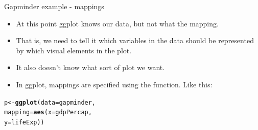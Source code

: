 \documentclass[10pt,handout]{beamer}\usepackage[]{graphicx}\usepackage[]{color}
\makeatletter
\newcommand{\hlstd}[1]{\textcolor[rgb]{0.345,0.345,0.345}{#1}}%
\newcommand{\hlkwb}[1]{\textcolor[rgb]{0.69,0.353,0.396}{#1}}%
\newcommand{\hlkwc}[1]{\textcolor[rgb]{0.333,0.667,0.333}{#1}}%
\newcommand{\hlkwd}[1]{\textcolor[rgb]{0.737,0.353,0.396}{\textbf{#1}}}%
\newenvironment{kframe}{%
 \def\at@end@of@kframe{}%
 \ifinner\ifhmode%
  \def\at@end@of@kframe{\end{minipage}}%
  \begin{minipage}{\columnwidth}%
 \fi\fi%
 \def\FrameCommand##1{\hskip\@totalleftmargin \hskip-\fboxsep
 \colorbox{shadecolor}{##1}\hskip-\fboxsep
     \hskip-\linewidth \hskip-\@totalleftmargin \hskip\columnwidth}%
 \MakeFramed {\advance\hsize-\width
   \@totalleftmargin\z@ \linewidth\hsize
   \@setminipage}}%
 {\par\unskip\endMakeFramed%
 \at@end@of@kframe}
\newenvironment{knitrout}{}{} %
\makeatother
\begin{document}
\begin{frame}[fragile]{Gapminder example - mappings}
	
	\begin{itemize}
		\item At this point ggplot knows our data, but not what the mapping. 
		\item That is, we need to tell it which variables in the data should be represented by which visual elements in the plot. \item It also doesn’t know what sort of plot we want. 
		\item In ggplot, mappings are specified using the  function. Like this:
	\end{itemize}
	
\begin{knitrout}
\color{fgcolor}\begin{kframe}
\begin{alltt}
\hlstd{p} \hlkwb{<-} \hlkwd{ggplot}\hlstd{(}\hlkwc{data} \hlstd{= gapminder,}
            \hlkwc{mapping} \hlstd{=} \hlkwd{aes}\hlstd{(}\hlkwc{x} \hlstd{= gdpPercap,}
                          \hlkwc{y} \hlstd{= lifeExp))}
\end{alltt}
\end{kframe}
\end{knitrout}
	
\end{frame}
\end{document}
